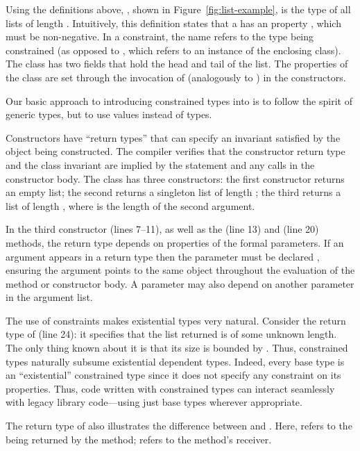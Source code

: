 Using the definitions above, , shown in
Figure~\ref{fig:list-example}, is the type of all lists of
length .
%
Intuitively, this definition states that a  has an 
property , which must be non-negative.
In a constraint, the name  refers to the type being
constrained (as opposed to , which refers to
an instance of the enclosing class).
The class has two
fields that hold the head and tail of the list.  The properties
of the
class are set through the invocation of \tcd{(\ldots)}
(analogously to \tcd{(\ldots)}) in the constructors.

Our basic approach to introducing constrained types into \Xten{}
is to follow the spirit of generic types, but to use values
instead of types.

Constructors have ``return
types'' that can specify an invariant satisfied by the object being
constructed.  The compiler verifies that the
constructor return type and the class invariant are implied by the
 statement and any  calls in the constructor
body.
The  class has three constructors: the first
constructor returns an empty list; the second returns 
a singleton list of length ; the third
returns a list of length , where  is
the length of the second argument.

In the third constructor (lines 7--11), as well as 
the  (line 13) and  (line 20) methods,
the return type
depends on properties of the formal parameters. 
If an argument appears in a
return type then the parameter must be declared ,
ensuring the
argument points to the same object throughout the evaluation of
the method or constructor body.  A parameter may also depend on
another parameter in the argument list.

The use of constraints makes existential types very natural.
Consider the return type of  (line 24): it specifies
that the list returned is of some unknown length. The only thing
known about it is that its size is bounded by .
Thus,
constrained types naturally subsume existential dependent types.
Indeed, every base type  is an ``existential''
constrained type since it does not specify any constraint on its
properties. Thus, code written with constrained types can
interact seamlessly with legacy library code---using just base
types wherever appropriate.

The return type of  also illustrates the difference
between  and .  Here,  refers to
the  being returned by the method;  refers
to the method's receiver.

